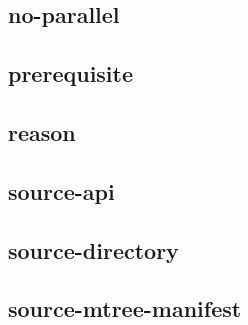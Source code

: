 \subsection{no-parallel}
\subsection{prerequisite}
\subsection{reason}
\subsection{source-api}
\subsection{source-directory}
\subsection{source-mtree-manifest}

